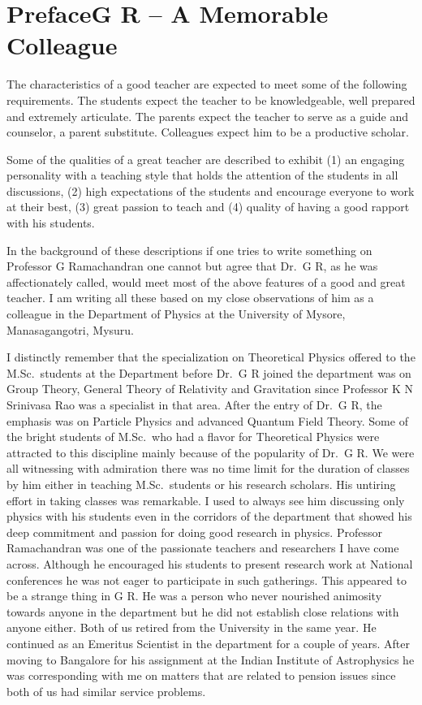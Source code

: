 \chapter*{Preface\break G R – A Memorable Colleague}

The characteristics of a good teacher are expected to meet some of the following requirements. The students expect the teacher to be knowledgeable, well prepared and extremely articulate. The parents expect the teacher to serve as a guide and counselor, a parent substitute. Colleagues expect him to be a productive scholar.

Some of the qualities of a great teacher are described to exhibit (1) an engaging personality with a teaching style that holds the attention of the students in all discussions, (2) high expectations of the students and encourage everyone to work at their best, (3) great  passion to teach and  (4) quality of having a good rapport with his students.

In the background of these descriptions if one tries to write something on Professor G Ramachandran one cannot but agree that Dr.\ G R, as he was affectionately called, would meet most of the above features of a good and great teacher. I am writing all these based on my close observations of him as a colleague in the Department of Physics at the University of Mysore, Manasagangotri, Mysuru.

I distinctly remember that the specialization on Theoretical Physics offered to the M.Sc.\ students at the Department before Dr.\ G R joined the department was on Group Theory, General Theory of Relativity and Gravitation since Professor K N Srinivasa Rao was a specialist in that area. After the entry of Dr.\ G R, the emphasis was on Particle Physics and advanced Quantum Field Theory. Some of the bright students of M.Sc.\ who had a flavor for Theoretical Physics were attracted to this discipline mainly because of the popularity of Dr.\ G R. We were all witnessing with admiration there was no time limit for the duration of classes by him either in teaching M.Sc.\ students or his research scholars. His untiring effort in taking classes was remarkable. I used to always see him discussing only physics with his students even in the corridors of the department that showed his deep commitment and passion for doing good research in physics.  Professor Ramachandran was one of the passionate teachers and researchers I have come across. Although he encouraged his students to present research work at National conferences he was not eager to participate in such gatherings. This appeared to be a strange thing in G R.  He was a person who never nourished animosity towards anyone in the department but he did not establish close relations with anyone either. Both of us retired from the University in the same year. He continued as an Emeritus Scientist in the department for a couple of years. After moving to Bangalore for his assignment at the Indian Institute of Astrophysics he was corresponding with me on matters that are related to pension issues since both of us had similar service problems.

